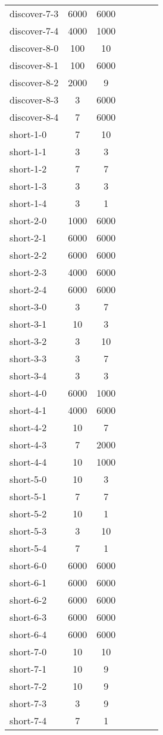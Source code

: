\documentclass[preview]{standalone}
\begin{document}
\begin{table}[!ht]
\begin{tabular}{lcccccc}
 discover-7-3 & 6000 & 6000 \\ 
 discover-7-4 & 4000 & 1000 \\ 
 discover-8-0 & 100 & 10 \\ 
 discover-8-1 & 100 & 6000 \\ 
 discover-8-2 & 2000 & 9 \\ 
 discover-8-3 & 3 & 6000 \\ 
 discover-8-4 & 7 & 6000 \\ 
 short-1-0 & 7 & 10 \\ 
 short-1-1 & 3 & 3 \\ 
 short-1-2 & 7 & 7 \\ 
 short-1-3 & 3 & 3 \\ 
 short-1-4 & 3 & 1 \\ 
 short-2-0 & 1000 & 6000 \\ 
 short-2-1 & 6000 & 6000 \\ 
 short-2-2 & 6000 & 6000 \\ 
 short-2-3 & 4000 & 6000 \\ 
 short-2-4 & 6000 & 6000 \\ 
 short-3-0 & 3 & 7 \\ 
 short-3-1 & 10 & 3 \\ 
 short-3-2 & 3 & 10 \\ 
 short-3-3 & 3 & 7 \\ 
 short-3-4 & 3 & 3 \\ 
 short-4-0 & 6000 & 1000 \\ 
 short-4-1 & 4000 & 6000 \\ 
 short-4-2 & 10 & 7 \\ 
 short-4-3 & 7 & 2000 \\ 
 short-4-4 & 10 & 1000 \\ 
 short-5-0 & 10 & 3 \\ 
 short-5-1 & 7 & 7 \\ 
 short-5-2 & 10 & 1 \\ 
 short-5-3 & 3 & 10 \\ 
 short-5-4 & 7 & 1 \\ 
 short-6-0 & 6000 & 6000 \\ 
 short-6-1 & 6000 & 6000 \\ 
 short-6-2 & 6000 & 6000 \\ 
 short-6-3 & 6000 & 6000 \\ 
 short-6-4 & 6000 & 6000 \\ 
 short-7-0 & 10 & 10 \\ 
 short-7-1 & 10 & 9 \\ 
 short-7-2 & 10 & 9 \\ 
 short-7-3 & 3 & 9 \\ 
 short-7-4 & 7 & 1 \\ 
 \end{tabular}
\end{table}
\end{document}
